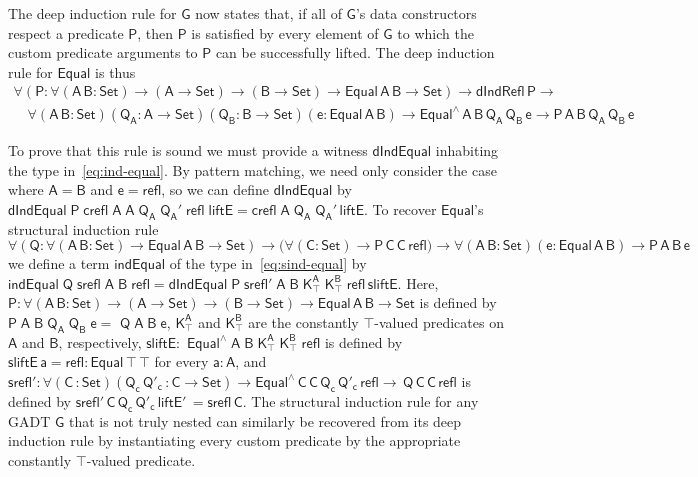 \documentclass[9pt]{entcs}
\begin{document}
The deep induction rule for $\mathsf{G}$ now states that, if all of
$\mathsf{G}$'s data constructors respect a predicate $\mathsf{P}$,
then $\mathsf{P}$ is satisfied by every element of $\mathsf{G}$ to
which the custom predicate arguments to $\mathsf{P}$ can be
successfully lifted.  The deep induction rule for $\mathsf{Equal}$ is
thus
\begin{equation}\label{eq:ind-equal}
\begin{array}{l}
\mathsf{\forall (P : \forall (A\,B : Set) \to (A \to Set) \to (B \to
  Set) \to Equal\,A\,B \to Set) \to dIndRefl\,P \to}\\ \quad 
  \mathsf{\forall (A\,B : Set) (Q_A : A \to Set) (Q_B : B \to Set) (e:
  Equal\,A\,B) \to Equal^{\wedge}\,A\,B\,Q_A\,Q_B\,e \to
  P\,A\,B\,Q_A\,Q_B\,e}
\end{array}
\end{equation}

To prove that this rule is sound we must provide a witness
$\mathsf{dIndEqual}$ inhabiting the type in~\eqref{eq:ind-equal}.  By
pattern matching, we need only consider the case where $\mathsf{A} =
\mathsf{B}$ and $\mathsf{e} = \mathsf{refl}$, so we can define
$\mathsf{dIndEqual}$ by
$\mathsf{dIndEqual\;P\;crefl\;A\;A\;Q_A\;Q_A'\;refl\;liftE =
  crefl\;A\;Q_A\;Q_A'\,liftE}$. To recover $\mathsf{Equal}$'s structural
induction rule
\begin{equation}\label{eq:sind-equal}
\mathsf{\forall (Q : \forall (A\,B : Set)
  \to Equal\,A\,B \to Set) \to \big( \forall (C : Set) \to
  P\,C\,C\,refl \big) \to \forall (A\,B : Set) (e: Equal\,A\,B) \to
  P\,A\,B\,e}
\end{equation}
we define a term $\mathsf{indEqual}$ of the type
in~\eqref{eq:sind-equal} by $\mathsf{indEqual\;Q\;srefl\;A\;B\;refl =
  dIndEqual\;P\;srefl'\;A\;B\;
  K^A_\top\;K^B_\top\;refl\,sliftE}$. Here, $\mathsf{P : \forall (A\,B
  : Set) \to (A \to Set) \to (B \to Set) \to Equal\,A\,B \to Set}$ is
defined by $\mathsf{P\;A\;B\;Q_A\;Q_B\;e =}$ $\mathsf{Q\;A\;B\;e}$,
$\mathsf{K^A_\top}$ and $\mathsf{K^B_\top}$ are the constantly
$\mathsf{\top}$-valued predicates on $\mathsf{A}$ and $\mathsf{B}$,
respectively, $\mathsf{sliftE :}$ $\mathsf{Equal^{\wedge}\;A\;B\;
  K^A_\top\;K^B_\top\;refl}$ is defined by $\mathsf{sliftE\,a = refl :
  Equal\, \top\,\top}$ for every $\mathsf{a : A}$, and $\mathsf{srefl'
  : \forall (C\,: Set) (Q_c\,Q'_c\, : C \to Set) \to
  Equal^{\wedge}\,C\,C\,Q_c\,Q'_c\,refl \to \,Q\,C\,C\,refl}$ is
defined by $\mathsf{srefl'\,C\,Q_c\,Q'_c\,liftE'\,=srefl\, C}$.  The
structural induction rule for any GADT $\mathsf{G}$ that is not truly
nested can similarly be recovered from its deep induction rule by
instantiating every custom predicate by the appropriate constantly
$\mathsf{\top}$-valued predicate.
\end{document}
